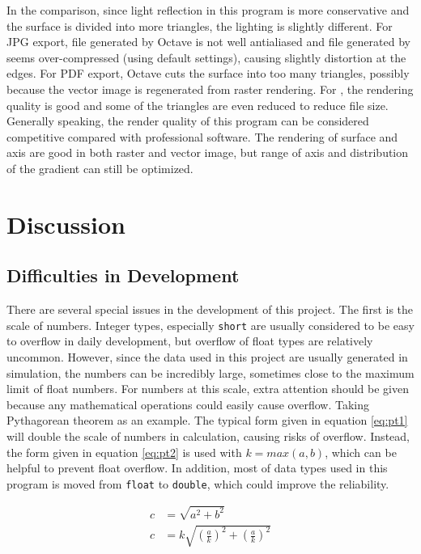 In the comparison, since light reflection in this program is more conservative and the surface is divided into more triangles, the lighting is slightly different. For JPG export, file generated by Octave is not well antialiased and file generated by \MatLab{} seems over-compressed (using default settings), causing slightly distortion at the edges. For PDF export, Octave cuts the surface into too many triangles, possibly because the vector image is regenerated from raster rendering. For \MatLab{}, the rendering quality is good and some of the triangles are even reduced to reduce file size. Generally speaking, the render quality of this program can be considered competitive compared with professional software. The rendering of surface and axis are good in both raster and vector image, but range of axis and distribution of the gradient can still be optimized.

\section{Discussion}

\subsection{Difficulties in Development}

There are several special issues in the development of this project. The first is the scale of numbers. Integer types, especially \lstinline{short} are usually considered to be easy to overflow in daily development, but overflow of float types are relatively uncommon. However, since the data used in this project are usually generated in simulation, the numbers can be incredibly large, sometimes close to the maximum limit of float numbers. For numbers at this scale, extra attention should be given because any mathematical operations could easily cause overflow. Taking Pythagorean theorem as an example. The typical form given in equation \ref{eq:pt1} will double the scale of numbers in calculation, causing risks of overflow. Instead, the form given in equation \ref{eq:pt2} is used with $k=max(a, b)$, which can be helpful to prevent float overflow. In addition, most of data types used in this program is moved from \lstinline{float} to \lstinline{double}, which could improve the reliability.

\begin{align}
	c &= \sqrt{a^2 + b^2} \label{eq:pt1}\\
	c &= k\sqrt{(\frac{a}{k})^2 + (\frac{a}{k})^2} \label{eq:pt2}
\end{align}

